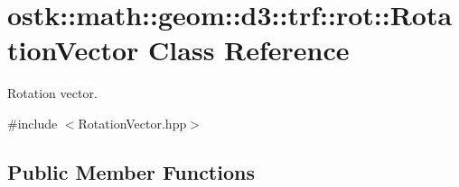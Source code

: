 \hypertarget{classostk_1_1math_1_1geom_1_1d3_1_1trf_1_1rot_1_1_rotation_vector}{}\section{ostk\+:\+:math\+:\+:geom\+:\+:d3\+:\+:trf\+:\+:rot\+:\+:Rotation\+Vector Class Reference}
\label{classostk_1_1math_1_1geom_1_1d3_1_1trf_1_1rot_1_1_rotation_vector}


Rotation vector.  




{\ttfamily \#include $<$Rotation\+Vector.\+hpp$>$}

\subsection*{Public Member Functions}
